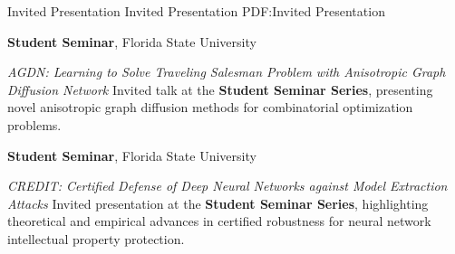 \newpage
\Section
{Invited Presentation}
{Invited Presentation}
{PDF:Invited Presentation}

\Entry
\textbf{Student Seminar},
Florida State University

\Gap
\BulletItem
\textit{AGDN: Learning to Solve Traveling Salesman Problem with Anisotropic Graph Diffusion Network}
\newline
Invited talk at the \textbf{Student Seminar Series}, presenting novel anisotropic graph diffusion methods for combinatorial optimization problems.

\BigGap
\Entry
\textbf{Student Seminar},
Florida State University

\Gap
\BulletItem
\textit{CREDIT: Certified Defense of Deep Neural Networks against Model Extraction Attacks}
\hfill
{}
\newline
Invited presentation at the \textbf{Student Seminar Series}, highlighting theoretical and empirical advances in certified robustness for neural network intellectual property protection.
